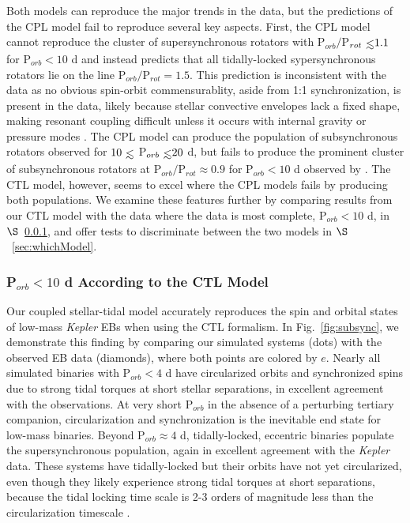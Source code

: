 \documentclass[twocolumn]{aastex61}
\def\lsim{~\rlap{$<$}{\lower 1.0ex\hbox{$\sim$}}}
\newcommand{\kepler}[0]{\textit{Kepler}\xspace}
\begin{document}
Both models can reproduce the major trends in the data, but the predictions of the CPL model fail to reproduce several key aspects.  First, the CPL model cannot reproduce the cluster of supersynchronous rotators with P$_{orb}/$P$_{rot} \lsim 1.1$ for P$_{orb} < 10$ d and instead predicts that all tidally-locked sypersynchronous rotators lie on the line P$_{orb}/$P$_{rot} = 1.5$.  This prediction is inconsistent with the data as no obvious spin-orbit commensurablity, aside from 1:1 synchronization, is present in the data, likely because stellar convective envelopes lack a fixed shape, making resonant coupling difficult unless it occurs with internal gravity or pressure modes \citep{Burkart2014,Lurie2017}.  The CPL model can produce the population of subsynchronous rotators observed for $10 \lsim$ P$_{orb} \lsim 20$ d, but fails to produce the prominent cluster of subsynchronous rotators at P$_{orb}/$P$_{rot} \approx 0.9$ for P$_{orb} < 10$ d observed by \citet{Lurie2017}.  The CTL model, however, seems to excel where the CPL models fails by producing both populations. We examine these features further by comparing results from our CTL model with the \citet{Lurie2017} data where the data is most complete, P$_{orb} < 10$ d, in $\S$~\ref{sec:subsync}, and offer tests to discriminate between the two models in $\S$~\ref{sec:whichModel}. 

\subsubsection{P$_{orb} < 10$ d According to the CTL Model} \label{sec:subsync}

Our coupled stellar-tidal model accurately reproduces the spin and orbital states of low-mass \kepler EBs when using the CTL formalism. In Fig.~\ref{fig:subsync}, we demonstrate this finding by comparing our simulated systems (dots) with the observed \citet{Lurie2017} EB data (diamonds), where both points are colored by $e$.   Nearly all simulated binaries with P$_{orb} < 4$ d have circularized orbits and synchronized spins due to strong tidal torques at short stellar separations, in excellent agreement with the \citet{Lurie2017} observations. At very short P$_{orb}$ in the absence of a perturbing tertiary companion, circularization and synchronization is the inevitable end state for low-mass binaries.  Beyond P$_{orb} \approx 4$ d, tidally-locked, eccentric binaries populate the supersynchronous population, again in excellent agreement with the \citet{Lurie2017} \kepler data.  These systems have tidally-locked but their orbits have not yet circularized, even though they likely experience strong tidal torques at short separations, because the tidal locking time scale is 2-3 orders of magnitude less than the circularization timescale \citep{Mazeh2008}.
\end{document}
